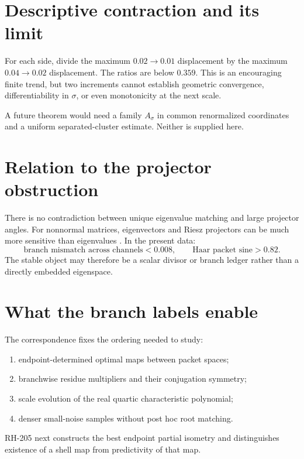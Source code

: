 \documentclass[12pt]{article}
\theoremstyle{remark}\newtheorem{remark}[theorem]{Remark}
\begin{document}
\section{Descriptive contraction and its limit}

For each side, divide the maximum $0.02\to0.01$ displacement by the maximum
$0.04\to0.02$ displacement.  The ratios are below $0.359$.  This is an
encouraging finite trend, but two increments cannot establish geometric
convergence, differentiability in $\sigma$, or even monotonicity at the next
scale.

A future theorem would need a family $A_\sigma$ in common renormalized
coordinates and a uniform separated-cluster estimate.  Neither is supplied
here.

\section{Relation to the projector obstruction}

There is no contradiction between unique eigenvalue matching and large
projector angles.  For nonnormal matrices, eigenvectors and Riesz projectors
can be much more sensitive than eigenvalues \citep{StewartSun1990}.  In the
present data:
\begin{equation*}
 \text{branch mismatch across channels}<0.008,
 \qquad
 \text{Haar packet sine}>0.82.
\end{equation*}
The stable object may therefore be a scalar divisor or branch ledger rather
than a directly embedded eigenspace.

\section{What the branch labels enable}

The correspondence fixes the ordering needed to study:
\begin{enumerate}[leftmargin=2em]
\item endpoint-determined optimal maps between packet spaces;
\item branchwise residue multipliers and their conjugation symmetry;
\item scale evolution of the real quartic characteristic polynomial;
\item denser small-noise samples without post hoc root matching.
\end{enumerate}
RH-205 next constructs the best endpoint partial isometry and distinguishes
existence of a shell map from predictivity of that map.
\end{document}
